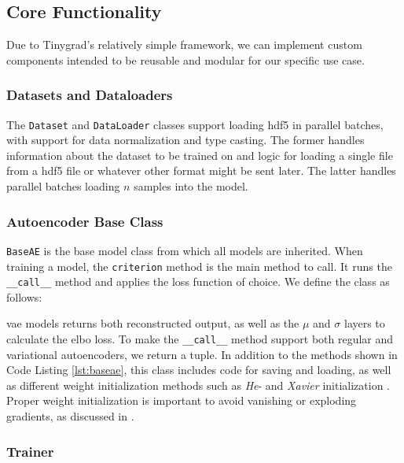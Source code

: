 \subsection{Core Functionality}

Due to Tinygrad's relatively simple framework, we can implement custom components intended to be reusable and modular for our specific use case.

\subsubsection{Datasets and Dataloaders}

The \texttt{Dataset} and \texttt{DataLoader} classes support loading \acrshort{hdf5} in parallel batches, with support for data normalization and type casting. The former handles information about the dataset to be trained on and logic for loading a single file from a \acrshort{hdf5} file or whatever other format might be sent later. The latter handles parallel batches loading $n$ samples into the model.

\subsubsection{Autoencoder Base Class}

\lstinline{BaseAE} is the base model class from which all models are inherited. When training a model, the \lstinline{criterion} method is the main method to call. It runs the \lstinline{__call__} method and applies the loss function of choice.  We define the class as follows:



\acrshort{vae} models returns both reconstructed output, as well as the $\mu$ and $\sigma$ layers to calculate the \acrshort{elbo} loss. To make the \lstinline{__call__} method support both regular and variational autoencoders, we return a tuple.
In addition to the methods shown in Code Listing \ref{lst:baseae}, this class includes code for saving and loading, as well as different weight initialization methods such as \textit{He}- and \textit{Xavier} initialization \cite{kumar2017weight}. Proper weight initialization is important to avoid vanishing or exploding gradients, as discussed in \cite{narkhede2022review}. 

\subsubsection{Trainer}

